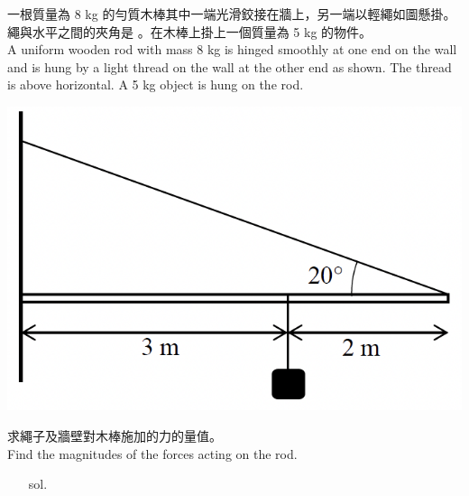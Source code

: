 \documentclass[beamer=true]{standalone}
\begin{document}
\begin{eg}
    一根質量為 8 kg 的勻質木棒其中一端光滑鉸接在牆上，另一端以輕繩如圖懸掛。繩與水平之間的夾角是 。在木棒上掛上一個質量為 5 kg 的物件。 \\A uniform wooden rod with mass 8 kg is hinged smoothly at one end on the wall and is hung by a light thread on the wall at the other end as shown. The thread is  above horizontal. A 5 kg object is hung on the rod.
        {\par\centering
            \includegraphics[width=.35\textwidth]{assets/b6070d24.png}
            \par}
    求繩子及牆壁對木棒施加的力的量值。 \\Find the magnitudes of the forces acting on the rod.
\end{eg}
\begin{eg}
    \begin{itemize}
        \item [sol.]
    \end{itemize}
\end{eg}
\end{document}
